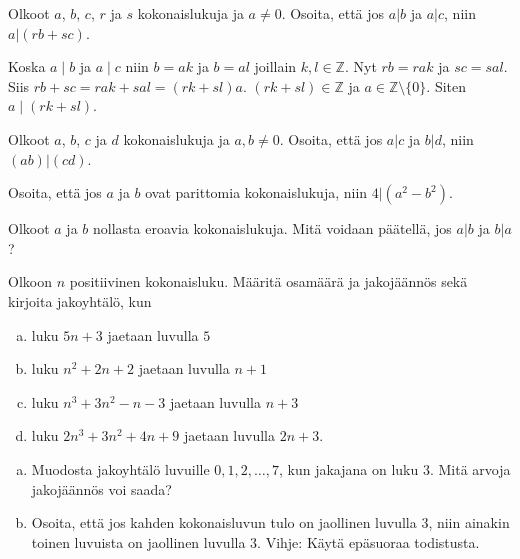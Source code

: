 \begin{tehtavasivu}
\begin{tehtava}
	Olkoot $a$, $b$, $c$, $r$ ja $s$ kokonaislukuja ja $a \neq 0$. Osoita, että jos $a|b$ ja $a|c$, niin $a|(rb + sc)$.
    \begin{vastaus}
        Koska $a\mid b$ ja $a\mid c$ niin $b = ak$ ja $b = al$ joillain $k, l \in \mathbb{Z}$. Nyt $rb = rak$ ja $sc = sal$. Siis $rb +sc = rak + sal = (rk + sl)a$. $(rk +sl) \in \mathbb{Z}$ ja $a\in \mathbb{Z}\setminus \lbrace 0 \rbrace$. Siten $a\mid(rk+sl)$. 
    \end{vastaus}
\end{tehtava}

\begin{tehtava}
	Olkoot $a$, $b$, $c$ ja $d$ kokonaislukuja ja $a, b \neq 0$. Osoita, että jos $a|c$ ja $b|d$, niin $(ab)|(cd)$.
\end{tehtava}

\begin{tehtava}
	Osoita, että jos $a$ ja $b$ ovat parittomia kokonaislukuja, niin $4 | (a^2 - b^2)$.
\end{tehtava}

\begin{tehtava}
	Olkoot $a$ ja $b$ nollasta eroavia kokonaislukuja. Mitä voidaan päätellä, jos $a|b$ ja $b|a$?
\end{tehtava}

\begin{tehtava}
	Olkoon $n$ positiivinen kokonaisluku. Määritä osamäärä ja jakojäännös sekä kirjoita jakoyhtälö, kun
	\begin{enumerate}[a)]
	\item luku $5n + 3$ jaetaan luvulla $5$
	\item luku $n^2 + 2n + 2$ jaetaan luvulla $n + 1$
	\item luku $n^3 + 3n^2 - n - 3$ jaetaan luvulla $n + 3$
	\item luku $2n^3 + 3n^2 + 4n + 9$ jaetaan luvulla $2n + 3$.
	\end{enumerate}
\end{tehtava}


\begin{tehtava}
	\begin{enumerate}[a)]
	\item Muodosta jakoyhtälö luvuille $0, 1, 2, \ldots, 7$, kun jakajana on luku $3$. Mitä arvoja jakojäännös voi saada?
	\item Osoita, että jos kahden kokonaisluvun tulo on jaollinen luvulla $3$, niin ainakin toinen luvuista on jaollinen luvulla $3$. Vihje: Käytä epäsuoraa todistusta.
	\end{enumerate}
\end{tehtava}

\end{tehtavasivu}


